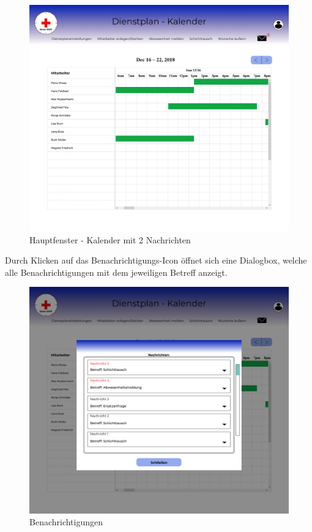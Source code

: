 \documentclass[11pt,
paper=a4,
bibtotocnumbered,	  %
liststotocnumbered,  %
DIV=calc,		  %
tablecaptionabove,	  %
headinclude,
]{article}
\begin{document}
\begin{figure}[H]
\includegraphics[width=1\textwidth]{Bilder/Screens/Hauptfenster-Kalendermit2Nachrichten.jpg}{\centering}
\caption{Hauptfenster - Kalender mit 2 Nachrichten
}
\end{figure}
Durch Klicken auf das Benachrichtigungs-Icon öffnet sich eine Dialogbox, welche alle Benachrichtigungen mit dem jeweiligen Betreff anzeigt. 
\begin{figure}[H]
\includegraphics[width=1\textwidth]{Bilder/Screens/Benachrichtigungen-Screen.jpg}{\centering}
\caption{Benachrichtigungen}
\end{figure}
\end{document}
